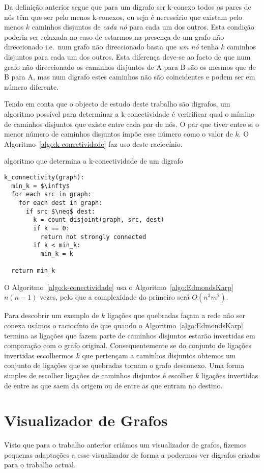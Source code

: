 \documentclass[10pt,a4paper]{article}
\begin{document}
Da definição anterior segue que para um digrafo ser k-conexo todos os pares de nós têm que ser pelo menos k-conexos, ou seja é necessário que existam pelo menos $k$ caminhos disjuntos de \emph{cada nó} para cada um dos outros. Esta condição poderia ser relaxada no caso de estarmos na presença de um grafo não direccionado i.e.\ num grafo não direccionado basta que \emph{um nó} tenha $k$ caminhos disjuntos para cada um dos outros. Esta diferença deve-se ao facto de que num grafo não direccionado os caminhos disjuntos de A para B são os mesmos que de B para A, mas num digrafo estes caminhos não são coincidentes e podem ser em número diferente.

Tendo em conta que o objecto de estudo deste trabalho são digrafos, um algoritmo possível para determinar a k-conectividade é veririficar qual o mímino de caminhos disjuntos que existe entre cada par de nós. O par que tiver entre si o menor número de caminhos disjuntos impõe esse número como o valor de $k$. O Algoritmo~\ref{algo:k-conectividade} faz uso deste raciocínio.

\begin{algorithm}[h]
\caption{algoritmo que determina a k-conectividade de um digrafo}
\label{algo:k-conectividade}
\begin{lstlisting}[linewidth=0.95\linewidth, mathescape]
k_connectivity(graph):
  min_k = $\infty$
  for each src in graph:
    for each dest in graph:
      if src $\neq$ dest:
        k = count_disjoint(graph, src, dest)
        if k == 0:
          return not strongly connected
        if k < min_k:
          min_k = k

  return min_k
\end{lstlisting}
\end{algorithm}

O Algoritmo~\ref{algo:k-conectividade} usa o Algoritmo~\ref{algo:EdmondsKarp} $n(n-1)$ vezes, pelo que a complexidade do primeiro será $O(n^3 m^2)$.

Para descobrir um exemplo de $k$ ligações que quebradas façam a rede não ser conexa usámos o raciocínio de que quando o Algoritmo~\ref{algo:EdmondsKarp} termina as ligações que fazem parte de caminhos disjuntos estarão invertidas em comparação com o grafo original. Consequentemente se do conjunto de ligações invertidas escolhermos $k$ que pertençam a caminhos disjuntos obtemos um conjunto de ligações que se quebradas tornam o grafo desconexo. Uma forma simples de escolher ligações de caminhos disjuntos é escolher $k$ ligações invertidas de entre as que saem da origem ou de entre as que entram no destino.

\section{Visualizador de Grafos}
Visto que para o trabalho anterior criámos um visualizador de grafos, fizemos pequenas adaptações a esse visualizador de forma a podermos ver digrafos criados para o trabalho actual.


\nocite{slidesADRC}
\end{document}
